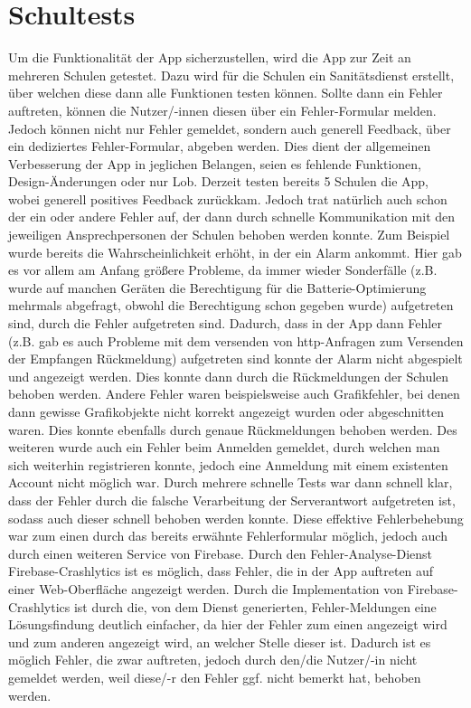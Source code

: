 \section{Schultests}
Um die Funktionalität der App sicherzustellen, wird die App zur Zeit an 
mehreren Schulen getestet. Dazu wird für die Schulen ein Sanitätsdienst erstellt,
über welchen diese dann alle Funktionen testen können. Sollte dann ein Fehler
auftreten, können die Nutzer/-innen diesen über ein Fehler-Formular melden. 
Jedoch können nicht nur Fehler gemeldet, sondern auch generell Feedback, über ein
dediziertes Fehler-Formular, abgeben werden. Dies dient der allgemeinen Verbesserung
der App in jeglichen Belangen, seien es fehlende Funktionen, Design-Änderungen
oder nur Lob. Derzeit testen bereits 5 Schulen die App, wobei generell positives
Feedback zurückkam. Jedoch trat natürlich auch schon der ein oder andere Fehler 
auf, der dann durch schnelle Kommunikation mit den jeweiligen 
Ansprechpersonen der Schulen behoben werden konnte.
Zum Beispiel wurde bereits die Wahrscheinlichkeit erhöht, in der ein Alarm 
ankommt. Hier gab es vor allem am Anfang größere Probleme, da immer wieder 
Sonderfälle (z.B. wurde auf manchen Geräten die Berechtigung für die Batterie-Optimierung
mehrmals abgefragt, obwohl die Berechtigung schon gegeben wurde) aufgetreten sind, durch 
die Fehler aufgetreten sind. Dadurch, dass in der App dann Fehler (z.B. gab es auch Probleme
mit dem versenden von http-Anfragen zum Versenden der \glqq Empfangen\grqq{} Rückmeldung) 
aufgetreten sind konnte der Alarm nicht abgespielt und angezeigt werden. Dies konnte dann 
durch die Rückmeldungen der Schulen behoben werden. Andere Fehler waren beispielsweise 
auch Grafikfehler, bei denen dann gewisse Grafikobjekte nicht korrekt angezeigt wurden 
oder abgeschnitten waren. Dies konnte ebenfalls durch genaue Rückmeldungen behoben werden.
Des weiteren wurde auch ein Fehler beim Anmelden gemeldet, durch welchen
man sich weiterhin registrieren konnte, jedoch eine Anmeldung mit einem 
existenten Account nicht möglich war.
Durch mehrere schnelle Tests war dann schnell klar, dass der Fehler durch die 
falsche Verarbeitung der Serverantwort aufgetreten ist, sodass auch dieser 
schnell behoben werden konnte. 
Diese effektive Fehlerbehebung war zum einen durch das bereits erwähnte 
Fehlerformular möglich, jedoch auch durch einen weiteren Service von Firebase.
Durch den Fehler-Analyse-Dienst \glqq Firebase-Crashlytics\grqq{} ist es möglich, dass Fehler, die in der App 
auftreten auf einer Web-Oberfläche angezeigt werden. Durch die Implementation 
von Firebase-Crashlytics ist durch die, von dem Dienst generierten, Fehler-Meldungen eine Lösungsfindung 
deutlich einfacher, da hier der Fehler zum einen angezeigt wird und zum anderen
angezeigt wird, an welcher Stelle dieser ist. Dadurch ist es möglich Fehler, die zwar auftreten, jedoch durch den/die
Nutzer/-in nicht gemeldet werden, weil diese/-r den Fehler ggf. nicht bemerkt hat, behoben werden.